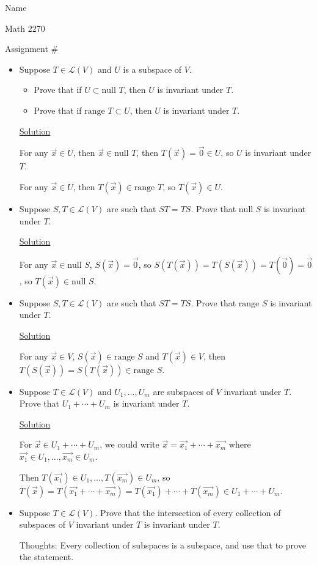 \documentclass[12pt]{article}
\begin{document}
\hfill Name 

\hfill Math 2270

\hfill Assignment \#


\begin{itemize}
\item[1)] Suppose $T \in \mathcal{L}(V)$ and $U$ is a subspace of $V$.
\begin{itemize}
    \item Prove that if $U \subset \text{null } T$, then $U$ is invariant under $T$.
    \item Prove that if $\text{range } T \subset U$, then $U$ is invariant under $T$.
\end{itemize}

\underline{Solution}

For any $\vec{x}\in U$, then $\vec{x}\in\text{null } T$, then $T(\vec{x})=\vec{0}\in U$, so $U$ is invariant under $T$.

For any $\vec{x}\in U$, then $T(\vec{x})\in\text{range } T$, so $T(\vec{x})\in U$.

\item[2)] Suppose $S,T \in \mathcal{L}(V)$ are such that $ST = TS$. Prove that $\text{null } S$ is invariant under $T$.

\underline{Solution}

For any $\vec{x}\in \text{null } S$, $S(\vec{x})=\vec{0}$, so $S(T(\vec{x}))=T(S(\vec{x}))=T(\vec{0})=\vec{0}$, so $T(\vec{x})\in \text{null } S$.

\item[3)] Suppose $S,T \in \mathcal{L}(V)$ are such that $ST = TS$. Prove that $\text{range } S$ is invariant under $T$.

\underline{Solution}

For any $\vec{x}\in V$, $S(\vec{x})\in\text{range } S$ and $T(\vec{x})\in V$, then $T(S(\vec{x}))=S(T(\vec{x}))\in\text{range } S$.

\item[4)] Suppose $T \in \mathcal{L}(V)$ and $U_1,\dots,U_m$ are subspaces of $V$ invariant under $T$. Prove that $U_1+\cdots+U_m$ is invariant under $T$.

\underline{Solution}

For $\vec{x}\in U_1+\cdots+U_m$, we could write $\vec{x}=\vec{x_1}+\cdots +\vec{x_m}$ where $\vec{x_1}\in U_1,\dots,\vec{x_m}\in U_m$.

Then $T(\vec{x_1})\in U_1,\dots,T(\vec{x_m})\in U_m$, so $T(\vec{x})=T(\vec{x_1}+\cdots +\vec{x_m})=T(\vec{x_1})+\cdots +T(\vec{x_m})\in U_1+\cdots+U_m$.

\item[5)] Suppose $T \in \mathcal{L}(V)$. Prove that the intersection of every collection of subspaces of $V$ invariant under $T$ is invariant under $T$.

Thoughts:
Every collection of subspaces is a subspace, and use that to prove the statement.

\end{itemize}
\end{document}
